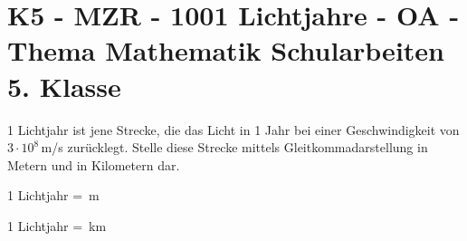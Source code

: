 \section{K5 - MZR - 1001 Lichtjahre - OA - Thema Mathematik Schularbeiten 5. Klasse}

\begin{beispiel}[K5 - MZR]{1} %
1 Lichtjahr ist jene Strecke, die das Licht in 1 Jahr bei einer Geschwindigkeit von $3\cdot 10^8\,$m/s zurücklegt. Stelle diese Strecke mittels Gleitkommadarstellung in Metern und in Kilometern dar. \leer

1 Lichtjahr = \,m

1 Lichtjahr = \,km \leer

\end{beispiel}